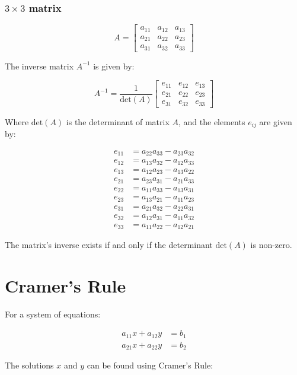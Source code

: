 \documentclass[11pt,a4paper]{book}
\theoremstyle{definition}\newtheorem{definition}{Definition}
\theoremstyle{definition}\newtheorem{fact}{Fact}
\theoremstyle{definition}\newtheorem{remark}{Remark}
\theoremstyle{definition}\newtheorem{ex}{Ex.}
\theoremstyle{definition}\newtheorem{project}{Project}
\theoremstyle{definition}\newtheorem{problem}{Problem}
\theoremstyle{definition}\newtheorem{example}{Example}
\numberwithin{theorem}{section}
\numberwithin{corollary}{chapter}
\numberwithin{assumption}{chapter}
\numberwithin{definition}{chapter}
\numberwithin{prop}{chapter}
\numberwithin{notation}{chapter}
\numberwithin{problem}{chapter}
\numberwithin{example}{chapter}
\numberwithin{fact}{chapter}
\numberwithin{ex}{chapter}
\begin{document}
\begin{appendices}
	\subsubsection{$3\times 3$ matrix}
\[
A = \begin{bmatrix}
	a_{11} & a_{12} & a_{13} \\
	a_{21} & a_{22} & a_{23} \\
	a_{31} & a_{32} & a_{33}
\end{bmatrix}
\]

The inverse matrix \(A^{-1}\) is given by:

\[
A^{-1} = \frac{1}{\text{det}(A)} \begin{bmatrix}
	e_{11} & e_{12} & e_{13} \\
	e_{21} & e_{22} & e_{23} \\
	e_{31} & e_{32} & e_{33}
\end{bmatrix}
\]

Where \(\text{det}(A)\) is the determinant of matrix \(A\), and the elements \(e_{ij}\) are given by:

\begin{align*}
	e_{11} &= a_{22}a_{33} - a_{23}a_{32} \\
	e_{12} &= a_{13}a_{32} - a_{12}a_{33} \\
	e_{13} &= a_{12}a_{23} - a_{13}a_{22} \\
	e_{21} &= a_{23}a_{31} - a_{21}a_{33} \\
	e_{22} &= a_{11}a_{33} - a_{13}a_{31} \\
	e_{23} &= a_{13}a_{21} - a_{11}a_{23} \\
	e_{31} &= a_{21}a_{32} - a_{22}a_{31} \\
	e_{32} &= a_{12}a_{31} - a_{11}a_{32} \\
	e_{33} &= a_{11}a_{22} - a_{12}a_{21}
\end{align*}


The matrix's inverse exists if and only if the determinant \(\text{det}(A)\) is non-zero.

	\section*{Cramer's Rule}
	For a system of equations:
	

	\begin{align*}
		a_{11}x + a_{12}y &= b_1 \\
		a_{21}x + a_{22}y &= b_2
	\end{align*}

	
	The solutions \(x\) and \(y\) can be found using Cramer's Rule:
	

\end{appendices}
\end{document}

